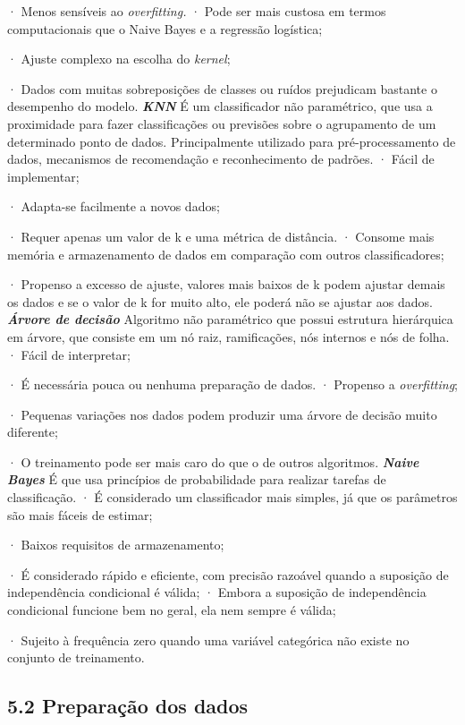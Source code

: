 \documentclass[
  brazilian,
  11pt,
]{article}
\begin{document}
· Menos sensíveis ao \emph{overfitting.} \textbar{} · Pode ser mais custosa em termos computacionais que o Naive Bayes e a regressão logística;

· Ajuste complexo na escolha do \emph{kernel};

· Dados com muitas sobreposições de classes ou ruídos prejudicam bastante o desempenho do modelo. \textbar{}
\textbar{} \textbf{\emph{KNN}} \textbar{} É um classificador não paramétrico, que usa a proximidade para fazer classificações ou previsões sobre o agrupamento de um determinado ponto de dados. Principalmente utilizado para pré-processamento de dados, mecanismos de recomendação e reconhecimento de padrões. \textbar{} · Fácil de implementar;

· Adapta-se facilmente a novos dados;

· Requer apenas um valor de k e uma métrica de distância. \textbar{} · Consome mais memória e armazenamento de dados em comparação com outros classificadores;

· Propenso a excesso de ajuste, valores mais baixos de k podem ajustar demais os dados e se o valor de k for muito alto, ele poderá não se ajustar aos dados. \textbar{}
\textbar{} \textbf{\emph{Árvore de decisão}} \textbar{} Algoritmo não paramétrico que possui estrutura hierárquica em árvore, que consiste em um nó raiz, ramificações, nós internos e nós de folha. \textbar{} · Fácil de interpretar;

· É necessária pouca ou nenhuma preparação de dados. \textbar{} · Propenso a \emph{overfitting};

· Pequenas variações nos dados podem produzir uma árvore de decisão muito diferente;

· O treinamento pode ser mais caro do que o de outros algoritmos. \textbar{}
\textbar{} \textbf{\emph{Naive Bayes}} \textbar{} É que usa princípios de probabilidade para realizar tarefas de classificação. \textbar{} · É considerado um classificador mais simples, já que os parâmetros são mais fáceis de estimar;

· Baixos requisitos de armazenamento;

· É considerado rápido e eficiente, com precisão razoável quando a suposição de independência condicional é válida; \textbar{} · Embora a suposição de independência condicional funcione bem no geral, ela nem sempre é válida;

· Sujeito à frequência zero quando uma variável categórica não existe no conjunto de treinamento. \textbar{}

\subsection{5.2 Preparação dos dados}\label{preparauxe7uxe3o-dos-dados}
\end{document}

